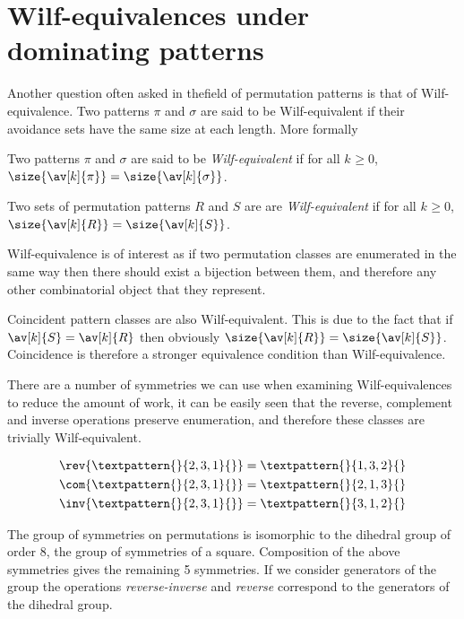 \chapter[Wilf-Classification]{Wilf-equivalences under dominating  patterns}

Another question often asked in thefield of permutation patterns is that
of Wilf-equivalence. Two patterns \(\pi\) and \(\sigma\) are said to be
Wilf-equivalent if their avoidance sets have the same size at each
length. More formally

\begin{definition}
    Two patterns \(\pi\) and \(\sigma\) are said to be \emph{Wilf-equivalent}
    if for all \(k_{} \ge 0\), \(\size{\av[k]{\pi}} = \size{\av[k]{\sigma}}\).

    Two sets of permutation patterns \(R\) and \(S\) are are
    \emph{Wilf-equivalent} if for all \(k_{} \ge 0\),
    \(\size{\av[k]{R}} = \size{\av[k]{S}}\).
\end{definition}

Wilf-equivalence is of interest as if two permutation classes are enumerated
in the same way then there should exist a bijection between them, and therefore
any other combinatorial object that they represent.

Coincident pattern classes are also Wilf-equivalent. This is due to the fact that
if \(\av[k]{S} = \av[k]{R}\) then obviously \(\size{\av[k]{R}} = \size{\av[k]{S}}\).
Coincidence is therefore a stronger equivalence condition than Wilf-equivalence.

There are a number of symmetries we can use when examining Wilf-equivalences
to reduce the amount of work, it can be easily seen that the reverse, complement
and inverse operations preserve enumeration, and therefore these classes are trivially
Wilf-equivalent.

\begin{align*}
    \rev{\textpattern{}{2,3,1}{}} &= \textpattern{}{1,3,2}{}\\
    \com{\textpattern{}{2,3,1}{}} &= \textpattern{}{2,1,3}{}\\
    \inv{\textpattern{}{2,3,1}{}} &= \textpattern{}{3,1,2}{}
\end{align*}

The group of symmetries on permutations is isomorphic to the dihedral group
of order \(8\), the group of symmetries of a square. Composition of the above
symmetries gives the remaining 5 symmetries. If we consider generators of the
group the operations \emph{reverse-inverse} and \emph{reverse} correspond to
the generators of the dihedral group.


